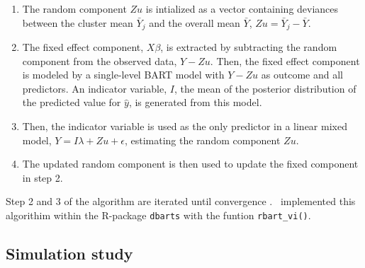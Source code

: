 \documentclass[10pt, a4paper, titlepage]{article}
\begin{document}
\begin{enumerate}
    \item The random component $Zu$ is intialized as a vector containing deviances between the cluster mean $\bar{Y}_j$ and the overall mean $\bar{Y}$, $Zu = \bar{Y}_j - \bar{Y}$.
    \item The fixed effect component, $X\beta$, is extracted by subtracting the random component from the observed data, $Y - Zu$. Then, the fixed effect component is modeled by a single-level BART model with $Y - Zu$ as outcome and all predictors. An indicator variable, $I$, the mean of the posterior distribution of the predicted value for $\hat{y}$, is generated from this model.
    \item Then, the indicator variable is used as the only predictor in a linear mixed model, $Y = I\lambda + Zu + \epsilon$, estimating the random component $Zu$. 
    \item The updated random component is then used to update the fixed component in step 2.
\end{enumerate} Step 2 and 3 of the algorithm are iterated until convergence \citep{chen2020, tan2016}.~\citet{dorie2024} implemented this algorithim within the R-package \texttt{dbarts} with the funtion \texttt{rbart\_vi()}.

\subsection{Simulation study}
\end{document}
